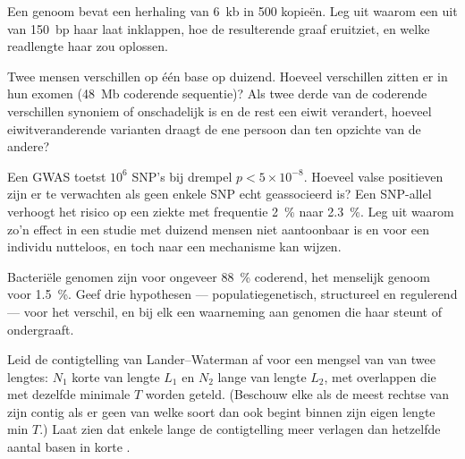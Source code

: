 \begin{exercise}[$\star\star$]\label{exo:b3:genomics:7}
Een genoom bevat een herhaling van \qty{6}{kb} in \num{500} kopieën.
Leg uit waarom een  uit  van \qty{150}{bp} haar laat
inklappen, hoe de resulterende graaf eruitziet, en welke readlengte
haar zou oplossen.
\end{exercise}

\begin{exercise}[$\star\star$]\label{exo:b3:genomics:8}
Twee mensen verschillen op één base op duizend. Hoeveel verschillen
zitten er in hun exomen (\qty{48}{Mb} coderende sequentie)? Als twee
derde van de coderende verschillen synoniem of onschadelijk is en de
rest een eiwit verandert, hoeveel eiwitveranderende varianten draagt de
ene persoon dan ten opzichte van de andere?
\end{exercise}

\begin{exercise}[$\star\star$]\label{exo:b3:genomics:9}
Een GWAS toetst $10^{6}$ SNP's bij drempel $p < 5\times 10^{-8}$.
Hoeveel valse positieven zijn er te verwachten als geen enkele SNP echt
geassocieerd is? Een SNP-allel verhoogt het risico op een ziekte met
frequentie \qty{2}{\%} naar \qty{2.3}{\%}. Leg uit waarom zo'n effect
in een studie met duizend mensen niet aantoonbaar is en voor een
individu nutteloos, en toch naar een mechanisme kan wijzen.
\end{exercise}

\begin{exercise}[$\star\star\star$]\label{exo:b3:genomics:10}
Bacteriële genomen zijn voor ongeveer \qty{88}{\%} coderend, het
menselijk genoom voor \qty{1.5}{\%}. Geef drie hypothesen ---
populatiegenetisch, structureel en regulerend --- voor het verschil, en
bij elk een waarneming aan genomen die haar steunt of ondergraaft.
\end{exercise}

\begin{exercise}[$\star\star\star$]\label{exo:b3:genomics:11}
Leid de contigtelling van Lander--Waterman af voor een mengsel van
 van twee lengtes: $N_{1}$ korte  van lengte $L_{1}$ en
$N_{2}$ lange  van lengte $L_{2}$, met overlappen die met dezelfde
minimale $T$ worden geteld. (Beschouw elke  als de meest rechtse
van zijn contig als er geen  van welke soort dan ook begint binnen
zijn eigen lengte min $T$.) Laat zien dat enkele lange  de
contigtelling meer verlagen dan hetzelfde aantal basen in korte .
\end{exercise}

